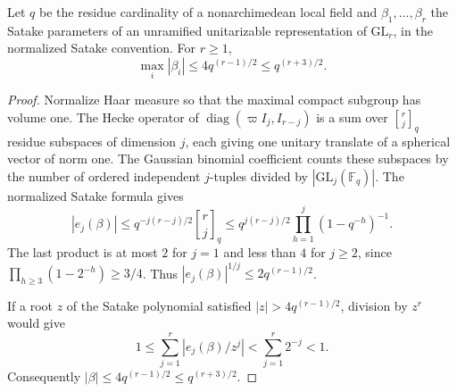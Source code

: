 \begin{auxlemma}
\label{lem:initial-spherical-bound}
Let \(q\) be the residue cardinality of a nonarchimedean local field
and \(\beta_1,\ldots,\beta_r\) the Satake parameters of an unramified
unitarizable representation of \(\mathrm{GL}_r\), in the normalized
Satake convention. For \(r\ge1\),
\[
             \max_i|\beta_i|\le4q^{(r-1)/2}\le q^{(r+3)/2}.
\]
\end{auxlemma}
\begin{proof}
Normalize Haar measure so that the maximal compact subgroup has volume one.
The Hecke operator of \(\operatorname{diag}(\varpi I_j,I_{r-j})\)
is a sum over \(\genfrac{[}{]}{0pt}{}{r}{j}_{\!q}\) residue subspaces of dimension \(j\), each giving
one unitary translate of a spherical vector of norm one. The Gaussian
binomial coefficient counts these subspaces by the number of ordered
independent \(j\)-tuples divided by \(|\mathrm{GL}_j(\mathbb F_q)|\). The normalized Satake formula gives
\[
 |e_j(\beta)|\le q^{-j(r-j)/2}\genfrac{[}{]}{0pt}{}{r}{j}_{\!q}
 \le q^{j(r-j)/2}\prod_{h=1}^j(1-q^{-h})^{-1}.
\]
The last product is at most \(2\) for \(j=1\) and less than \(4\)
for \(j\ge2\), since \(\prod_{h\ge3}(1-2^{-h})\ge3/4\).
Thus \(|e_j(\beta)|^{1/j}\le2q^{(r-1)/2}\).

If a root \(z\) of
the Satake polynomial satisfied \(|z|>4q^{(r-1)/2}\), division by
\(z^r\) would give
\[
      1\le\sum_{j=1}^r|e_j(\beta)/z^j|
                   < \sum_{j=1}^r2^{-j}<1 .
\]
Consequently \(|\beta|\le4q^{(r-1)/2}\le q^{(r+3)/2}\).
\end{proof}

